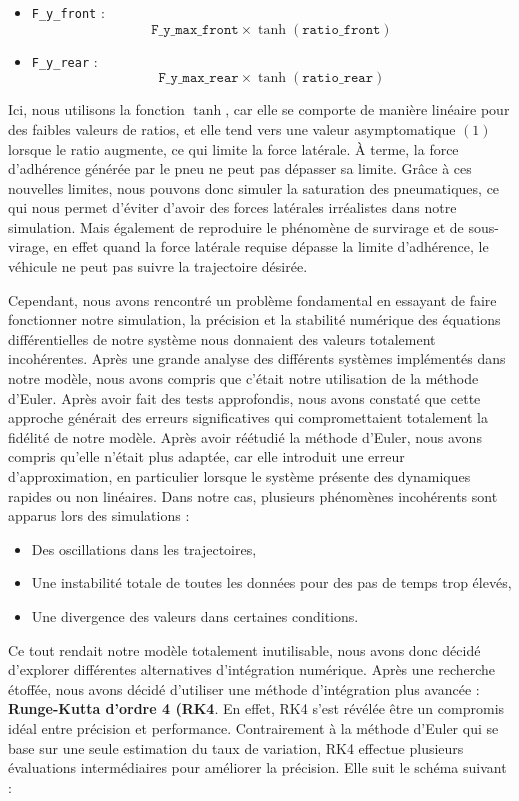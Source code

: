\begin{itemize}
    \item \texttt{F\_y\_front} : $$\texttt{F\_y\_max\_front} \times \tanh(\texttt{ratio\_front})$$
    \item \texttt{F\_y\_rear} : $$\texttt{F\_y\_max\_rear} \times \tanh(\texttt{ratio\_rear})$$
\end{itemize}

Ici, nous utilisons la fonction $\tanh$, car elle se comporte de manière linéaire pour des faibles valeurs de ratios, et elle tend vers une valeur asymptomatique $(1)$ lorsque le ratio augmente, ce qui limite la force latérale. À terme, la force d'adhérence générée par le pneu ne peut pas dépasser sa limite. Grâce à ces nouvelles limites, nous pouvons donc simuler la saturation des pneumatiques, ce qui nous permet d'éviter d'avoir des forces latérales irréalistes dans notre simulation. Mais également de reproduire le phénomène de survirage et de sous-virage, en effet quand la force latérale requise dépasse la limite d'adhérence, le véhicule ne peut pas suivre la trajectoire désirée.

Cependant, nous avons rencontré un problème fondamental en essayant de faire fonctionner notre simulation, la précision et la stabilité numérique des équations différentielles de notre système nous donnaient des valeurs totalement incohérentes. Après une grande analyse des différents systèmes implémentés dans notre modèle, nous avons compris que c'était notre utilisation de la méthode d'Euler. Après avoir fait des tests approfondis, nous avons constaté que cette approche générait des erreurs significatives qui compromettaient totalement la fidélité de notre modèle. Après avoir réétudié la méthode d'Euler, nous avons compris qu'elle n'était plus adaptée, car elle introduit une erreur d'approximation, en particulier lorsque le système présente des dynamiques rapides ou non linéaires. Dans notre cas, plusieurs phénomènes incohérents sont apparus lors des simulations :
\begin{itemize}
    \item Des oscillations dans les trajectoires,
    \item Une instabilité totale de toutes les données pour des pas de temps trop élevés,
    \item Une divergence des valeurs dans certaines conditions.
\end{itemize}
Ce tout rendait notre modèle totalement inutilisable, nous avons donc décidé d'explorer différentes alternatives d'intégration numérique. Après une recherche étoffée, nous avons décidé d'utiliser une méthode d'intégration plus avancée : \textbf{Runge-Kutta d'ordre 4 (RK4}. En effet, RK4 s'est révélée être un compromis idéal entre précision et performance. Contrairement à la méthode d'Euler qui se base sur une seule estimation du taux de variation, RK4 effectue plusieurs évaluations intermédiaires pour améliorer la précision. Elle suit le schéma suivant :

